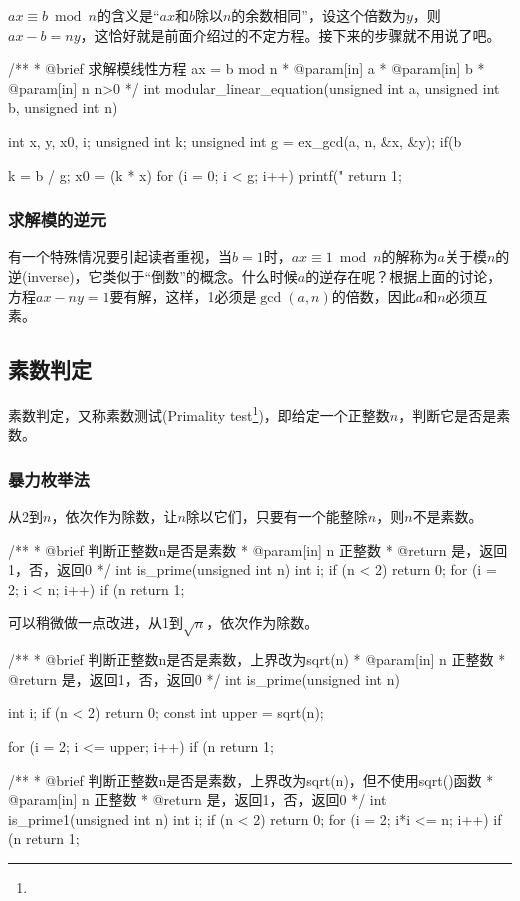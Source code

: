$ax \equiv b\bmod n$的含义是“$ax$和$b$除以$n$的余数相同”，设这个倍数为$y$，则$ax-b=ny$，这恰好就是前面介绍过的不定方程。接下来的步骤就不用说了吧。

\begin{Code}
/**
 * @brief 求解模线性方程 ax = b mod n
 * @param[in] a
 * @param[in] b
 * @param[in] n n>0
 */
int modular_linear_equation(unsigned int a, unsigned int b, unsigned int n) {
    int x, y, x0, i;
    unsigned int k;
    unsigned int g = ex_gcd(a, n, &x, &y);
    if(b %

    k = b / g;
    x0 = (k * x) %
    for (i = 0; i < g; i++)
        printf("%
    return 1;
}
\end{Code}


\subsubsection{求解模的逆元}
有一个特殊情况要引起读者重视，当$b=1$时，$ax \equiv 1\bmod n$的解称为$a$关于模$n$的逆(inverse)，它类似于“倒数”的概念。什么时候$a$的逆存在呢？根据上面的讨论，方程$ax-ny=1$要有解，这样，1必须是$\gcd(a,n)$的倍数，因此$a$和$n$必须互素。

\subsection{素数判定}
素数判定，又称素数测试(Primality test\footnote{})，即给定一个正整数$n$，判断它是否是素数。

\subsubsection{暴力枚举法}
从2到$n$，依次作为除数，让$n$除以它们，只要有一个能整除$n$，则$n$不是素数。

\begin{Code}
/**
 * @brief 判断正整数n是否是素数
 * @param[in] n 正整数
 * @return 是，返回1，否，返回0
 */
int is_prime(unsigned int n) {
    int i;
    if (n < 2) return 0;
    for (i = 2; i < n; i++) {
        if (n %
    }
    return 1;
}
\end{Code}

可以稍微做一点改进，从1到$\sqrt n$，依次作为除数。

\begin{Code}
/**
 * @brief 判断正整数n是否是素数，上界改为sqrt(n)
 * @param[in] n 正整数
 * @return 是，返回1，否，返回0
 */
int is_prime(unsigned int n) {
    int i;
    if (n < 2) return 0;
    const int upper = sqrt(n);

    for (i = 2; i <= upper; i++) {
        if (n %
    }
    return 1;
}

/**
 * @brief 判断正整数n是否是素数，上界改为sqrt(n)，但不使用sqrt()函数
 * @param[in] n 正整数
 * @return 是，返回1，否，返回0
 */
int is_prime1(unsigned int n) {
    int i;
    if (n < 2) return 0;
    for (i = 2; i*i <= n; i++) {
        if (n %
    }
    return 1;
}
\end{Code}

